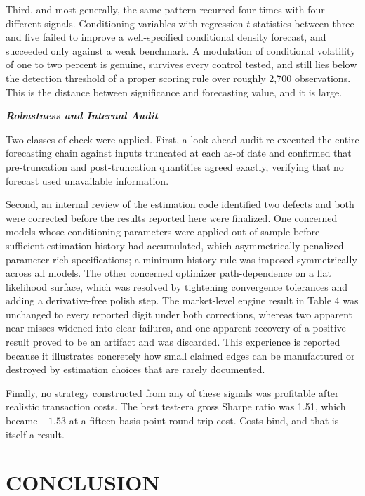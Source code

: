 \documentclass[12pt]{article}
\begin{document}
Third, and most generally, the same pattern recurred four times with four
different signals. Conditioning variables with regression $t$-statistics
between three and five failed to improve a well-specified conditional density
forecast, and succeeded only against a weak benchmark. A modulation of
conditional volatility of one to two percent is genuine, survives every
control tested, and still lies below the detection threshold of a proper
scoring rule over roughly 2,700 observations. This is the distance between
significance and forecasting value, and it is large.

\textbf{\emph{Robustness and Internal Audit}}

Two classes of check were applied. First, a look-ahead audit re-executed the
entire forecasting chain against inputs truncated at each as-of date and
confirmed that pre-truncation and post-truncation quantities agreed exactly,
verifying that no forecast used unavailable information.

Second, an internal review of the estimation code identified two defects and
both were corrected before the results reported here were finalized. One
concerned models whose conditioning parameters were applied out of sample
before sufficient estimation history had accumulated, which asymmetrically
penalized parameter-rich specifications; a minimum-history rule was imposed
symmetrically across all models. The other concerned optimizer
path-dependence on a flat likelihood surface, which was resolved by tightening
convergence tolerances and adding a derivative-free polish step. The
market-level engine result in Table 4 was unchanged to every reported digit
under both corrections, whereas two apparent near-misses widened into clear
failures, and one apparent recovery of a positive result proved to be an
artifact and was discarded. This experience is reported because it illustrates
concretely how small claimed edges can be manufactured or destroyed by
estimation choices that are rarely documented.

Finally, no strategy constructed from any of these signals was profitable
after realistic transaction costs. The best test-era gross Sharpe ratio was
1.51, which became $-1.53$ at a fifteen basis point round-trip cost. Costs
bind, and that is itself a result.

\section*{CONCLUSION}
\end{document}
